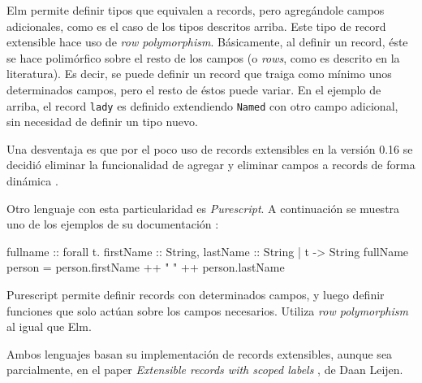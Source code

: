 Elm permite definir tipos que equivalen a records, pero agregándole campos adicionales, como es el caso de los tipos descritos arriba. Este tipo de record extensible hace uso de \textit{row polymorphism}. Básicamente, al definir un record, éste se hace polimórfico sobre el resto de los campos (o \textit{rows}, como es descrito en la literatura). Es decir, se puede definir un record que traiga como mínimo unos determinados campos, pero el resto de éstos puede variar. En el ejemplo de arriba, el record \texttt{lady} es definido extendiendo \texttt{Named} con otro campo adicional, sin necesidad de definir un tipo nuevo. 

Una desventaja es que por el poco uso de records extensibles en la versión 0.16 se decidió eliminar la funcionalidad de agregar y eliminar campos a records de forma dinámica \cite{ElmReducedRecordSyntax}.

Otro lenguaje con esta particularidad es \textit{Purescript}\cite{PurescriptByExample}. A continuación se muestra uno de los ejemplos de su documentación \cite{PurescriptRecords}:

\begin{code}
fullname :: forall t. { firstName :: String, 
  lastName :: String | t } -> String 
fullName person = person.firstName ++ " " ++ person.lastName
\end{code}

Purescript permite definir records con determinados campos, y luego definir funciones que solo actúan sobre los campos necesarios. Utiliza \textit{row polymorphism} al igual que Elm.

Ambos lenguajes basan su implementación de records extensibles, aunque sea parcialmente, en el paper \textit{Extensible records with scoped labels} \cite{Leijen:scopedlabels}, de Daan Leijen.

